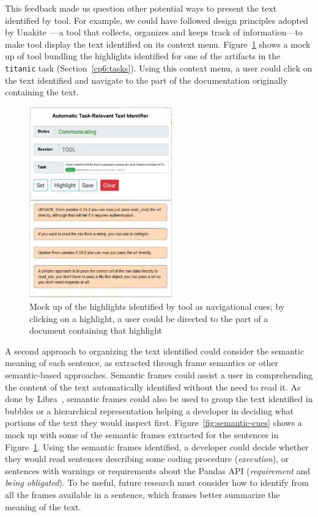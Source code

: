 \smallskip
This feedback made us question other potential ways to present the text identified by \acs{tool}.
For example, we could have followed design principles adopted by Unakite~\cite{Liu2018Unakite}---a tool that collects, organizes and keeps track of information---to make \acs{tool} display the text identified on its context menu.
Figure~\ref{fig:navigational-cues} shows a mock up of \acs{tool} bundling the highlights identified for one of the artifacts in the \texttt{titanic} task (Section~\ref{cp6:tasks}).
Using this context menu, a user could click on the text identified and navigate to the part of the documentation 
originally containing the text.



\begin{figure}[H]
    \centering
    \includegraphics[width=0.55\textwidth]{fig/cp7/navigational-cues}
    \caption{Mock up of the highlights identified by \acs{tool} as navigational cues; by clicking on a highlight, a user could be directed to the part of a document containing that highlight}
    \label{fig:navigational-cues}
\end{figure}



A second approach to organizing the text identified could consider 
the semantic meaning of each sentence, as extracted through frame semantics or other semantic-based approaches. 
Semantic frames could 
assist a user in comprehending the content of the text automatically identified
without the need to read it. 
As done by Libra~\cite{Ponzanelli2017}, semantic frames could also be used to group the text identified in bubbles or a hierarchical representation 
 helping a developer
in deciding what portions of the text they would inspect first. 
Figure~\ref{fig:semantic-cues} shows a mock up 
with some of the semantic frames extracted 
for the sentences in Figure~\ref{fig:navigational-cues}.
Using the semantic frames identified,
a developer could decide whether they would read sentences 
describing some coding procedure (\textit{execution}), or sentences 
with warnings or requirements about the Pandas API (\textit{requirement} and \textit{being obligated}). 
To be useful, future research must consider how to identify from all the frames available in a sentence, 
which frames
better summarize the meaning of the text. 


